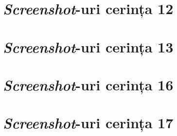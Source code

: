 \documentclass[a4paper, oneside, 12pt]{article}
\begin{document}


\bigskip



\bigskip



\bigskip



\bigskip



\bigskip

\section{\emph{Screenshot}-uri cerința 12}



\bigskip



\bigskip



\bigskip

\section{\emph{Screenshot}-uri cerința 13}



\bigskip

\section{\emph{Screenshot}-uri cerința 16}



\bigskip



\bigskip



\bigskip

\section{\emph{Screenshot}-uri cerința 17}



\bigskip



\bigskip
\end{document}
